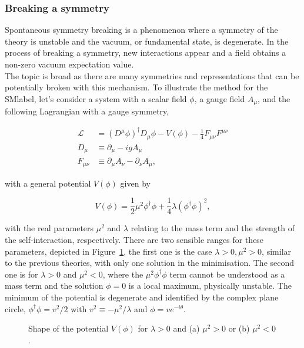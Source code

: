 \subsubsection{Breaking a symmetry}

Spontaneous symmetry breaking is a phenomenon where a symmetry of the theory is unstable and the vacuum, or fundamental state, is degenerate.
In the process of breaking a symmetry, new interactions appear and a field obtains a non-zero vacuum expectation value.\\

The topic is broad as there are many symmetries and representations that can be potentially broken with this mechanism. To illustrate the method for the \acrshort{SMlabel},
let's consider a system with a scalar field $\phi$, a gauge field $A_\mu$, and the following Lagrangian with a gauge symmetry,

\begin{equation}
    \begin{split}
    \mathcal{L}_{\ \ }&=(D^\mu\phi)^\dag D_\mu\phi - V(\phi) - \frac{1}{4}F_{\mu\nu}F^{\mu\nu}\\
    D_{\mu \ } &\equiv \partial_\mu - igA_\mu\\
    F_{\mu\nu}&\equiv\partial_\mu A_\nu - \partial_\nu A_\mu,
    \end{split}
\end{equation}

with a general potential $V(\phi)$ given by

\begin{equation}
    V(\phi) = \frac{1}{2}\mu^2\phi^\dag\phi + \frac{1}{4}\lambda(\phi^\dag\phi)^2,
\end{equation}

with the real parameters $\mu^2$ and $\lambda$ relating to the mass term and the strength of the self-interaction, respectively.
There are two sensible ranges for these parameters, depicted in Figure~\ref{figSM:higgspotential}, the first one is the case $\lambda>0,\mu^2>0$,
similar to the previous theories, with only one solution in the minimisation.
The second one is for $\lambda>0$ and $\mu^2<0$, where the $\mu^2\phi^\dag\phi$ term cannot be understood as a mass term and
the solution $\phi=0$ is a local maximum, physically unstable. The minimum of the potential is degenerate and identified by the complex
plane circle, $\phi^\dag\phi=v^2/2$ with $v^2\equiv-\mu^2/\lambda$ and $\phi = v e^{-i\theta}$.\\

\begin{figure}[htbp]
    \RawFloats
    \begin{center}
    \qquad
    \caption{Shape of the potential $V(\phi)$ for $\lambda>0$ and (a) $\mu^2>0$ or (b) $\mu^2<0$.
    }
    \label{figSM:higgspotential}
    \end{center}
\end{figure}

